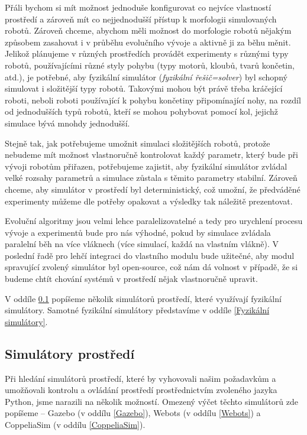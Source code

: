 Přáli bychom si mít možnost jednoduše konfigurovat co nejvíce vlastností
prostředí a zároveň mít co nejjednodušší přístup k morfologii simulovaných
robotů. Zároveň chceme, abychom měli možnost do morfologie robotů nějakým
způsobem zasahovat i v průběhu evolučního vývoje a aktivně ji za běhu měnit.
Jelikož plánujeme v různých prostředích provádět experimenty s různými typy
robotů, používajícími různé styly pohybu (typy motorů, kloubů, tvarů končetin,
atd.), je potřebné, aby fyzikální simulátor (\emph{fyzikální řešič=solver}) byl
schopný simulovat i složitější typy robotů. Takovými mohou být právě třeba
kráčející roboti, neboli roboti používající k pohybu končetiny připomínající
nohy, na rozdíl od jednodušších typů robotů, kteří se mohou pohybovat pomocí
kol, jejichž simulace bývá mnohdy jednodušší. 

Stejně tak, jak potřebujeme umožnit simulaci složitějších robotů, protože
nebudeme mít možnost vlastnoručně kontrolovat každý parametr, který bude při
vývoji robotům přiřazen, potřebujeme zajistit, aby fyzikální simulátor zvládal
velké rozsahy parametrů a simulace zůstala s těmito parametry stabilní. Zároveň
chceme, aby simulátor v prostředí byl deterministický, což umožní, že
předváděné experimenty můžeme dle potřeby opakovat a výsledky tak náležitě
prezentovat. 

Evoluční algoritmy jsou velmi lehce paralelizovatelné a tedy pro
urychlení procesu vývoje a experimentů bude pro nás výhodné, pokud by simulace
zvládala paralelní běh na více vláknech (více simulací, každá na vlastním
vlákně). V poslední řadě pro lehčí integraci do vlastního modulu bude užitečné,
aby modul spravující zvolený simulátor byl open-source, což nám dá volnost v
případě, že si budeme chtít chování systémů v prostředí nějak vlastnoručně
upravit.

V oddíle \ref{Simulátory prostředí} popíšeme několik simulátorů prostředí,
které využívají fyzikální simulátory. Samotné fyzikální simulátory představíme
v oddíle \ref{Fyzikální simulátory}.

\subsection{Simulátory prostředí} \label{Simulátory prostředí}

Při hledání simulátorů prostředí, které by vyhovovali našim požadavkům a
umožňovali kontrolu a ovládání prostředí prostřednictvím zvoleného jazyka
Python, jsme narazili na několik možností. Omezený výčet těchto simulátorů zde
popíšeme -- Gazebo (v oddílu \ref{Gazebo}), Webots (v oddílu \ref{Webots}) a
CoppeliaSim (v oddílu \ref{CoppeliaSim}).

